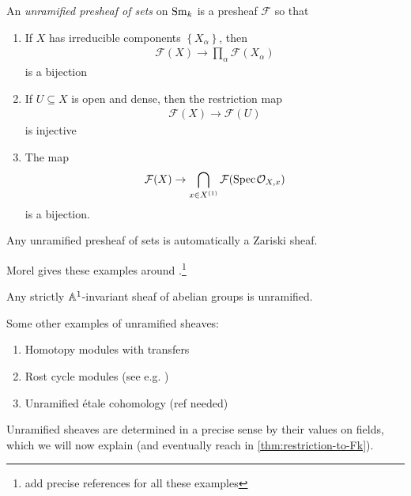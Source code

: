 \documentclass[11pt,openany]{book}
\begin{document}
\begin{definition} \cite[2.1]{Morel} An \textit{unramified presheaf of sets} on $\mathrm{Sm}_k$ is a presheaf $\mathcal{F}$ so that
\begin{enumerate}
    \item If $X$ has irreducible components $\left\{ X_\alpha \right\}$, then
    \begin{align*}
        \mathcal{F}(X) \to \prod_\alpha \mathcal{F}(X_\alpha)
    \end{align*}
    is a bijection
    \item If $U \subseteq X$ is open and dense, then the restriction map
    \begin{align*}
        \mathcal{F}(X) \to \mathcal{F}(U)
    \end{align*}
    is injective
    \item The map
    \begin{align*}
        \mathcal{F}(X) \to\bigcap_{x\in X^{(1)}} \mathcal{F}(\text{Spec}\hspace{0.1em} \mathcal{O}_{X,x})
    \end{align*}
    is a bijection.
\end{enumerate}
\end{definition}

\begin{example} Any unramified presheaf of sets is automatically a Zariski sheaf.
\end{example}

Morel gives these examples around \cite[2.3]{Morel}.\footnote{\todo add precise references for all these examples}

\begin{theorem} Any strictly $\mathbb{A}^1$-invariant sheaf of abelian groups is unramified.
\end{theorem}

\begin{example} Some other examples of unramified sheaves:
\begin{enumerate}
    \item Homotopy modules with transfers
    \item Rost cycle modules (see e.g. \cite[p.~338]{Rost-Chow})
    \item Unramified \'etale cohomology (ref needed)
\end{enumerate}
\end{example}

Unramified sheaves are determined in a precise sense by their values on fields, which we will now explain (and eventually reach in \autoref{thm:restriction-to-Fk}).
\end{document}
